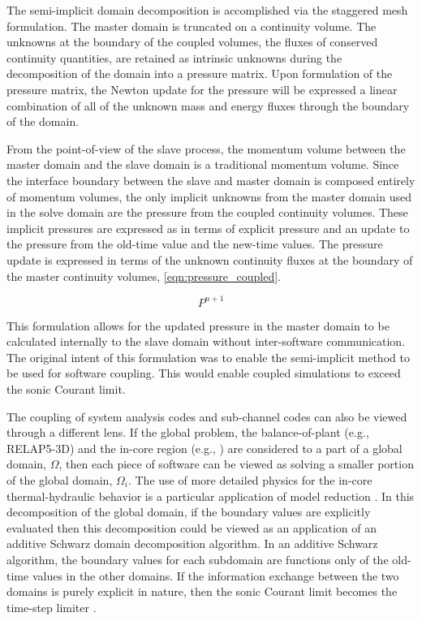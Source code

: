 The semi-implicit domain decomposition is accomplished via the staggered mesh formulation.
The master domain is truncated on a continuity volume.
The unknowns at the boundary of the coupled volumes, the fluxes of conserved continuity quantities, are retained as intrinsic unknowns during the decomposition of the domain into a pressure matrix.
Upon formulation of the pressure matrix, the Newton update for the pressure will be expressed a linear combination of all of the unknown mass and energy fluxes through the boundary of the domain.

From the point-of-view of the slave process, the momentum volume between the master domain and the slave domain is a traditional momentum volume.
Since the interface boundary between the slave and master domain is composed entirely of momentum volumes, the only implicit unknowns from the master domain used in the solve domain are the pressure from the coupled continuity volumes.
These implicit pressures are expressed as in terms of explicit pressure and an update to the pressure from the old-time value and the new-time values.
The pressure update is expressed in terms of the unknown continuity fluxes at the boundary of the master continuity volumes, \eqref{eqn:pressure_coupled}.

\begin{equation}
\label{eqn:pressure_coupled}
P^{n+1}
\end{equation}

This formulation allows for the updated pressure in the master domain to be calculated internally to the slave domain without inter-software communication.
The original intent of this formulation was to enable the semi-implicit method to be used for software coupling.
This would enable coupled simulations to exceed the sonic Courant limit.

The coupling of system analysis codes and sub-channel codes can also be viewed through a different lens.
If the global problem, the balance-of-plant (e.g., RELAP5-3D) and the in-core region (e.g., \cobra{}) are considered to a part of a global domain, $\Omega$, then each piece of software can be viewed as solving a smaller portion of the global domain, $\Omega_i$.
The use of more detailed physics for the in-core thermal-hydraulic behavior is a particular application of model reduction \cite{Paraschivoiu1999}.
In this decomposition of the global domain, if the boundary values are explicitly evaluated then this decomposition could be viewed as an application of an additive Schwarz domain decomposition algorithm.
In an additive Schwarz algorithm, the boundary values for each subdomain are functions only of the old-time values in the other domains.
If the information exchange between the two domains is purely explicit in nature, then the sonic Courant limit becomes the time-step limiter \cite{Aumiller2001}.

